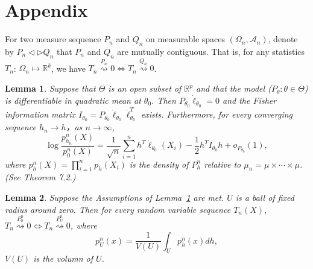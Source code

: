 \documentclass[review]{elsarticle}
\newtheorem{lemma}{Lemma}
\begin{document}
\section{Appendix}
For two measure sequence $P_n$ and $Q_n$ on measurable spaces $(\Omega_n,\mathcal{A}_n)$, denote by $P_n\triangleleft \triangleright Q_n$ that $P_n$ and $Q_n$ are mutually contiguous. That is, for any statistics $T_n$: $\Omega_n\mapsto \mathbb{R}^k$, we have $T_n\overset{P_n}{\rightsquigarrow}0\Leftrightarrow T_n\overset{Q_n}{\rightsquigarrow}0$.
\begin{lemma}\label{lemmaEx}
    Suppose that $\Theta$ is an open subset of $\mathbb{R}^p$ and that the model ($P_\theta: \theta \in\Theta$) is differentiable in quadratic mean at $\theta_0$. Then $P_{\theta_0}\dot{\ell}_{\theta_0}=0$ and the Fisher information matrix $I_{\theta_0}=P_{\theta_0}\dot{\ell}_{\theta_0}\dot{\ell}_{\theta_0}^T$ exists. Furthermore, for every converging sequence $h_n\to h$，as $n\to \infty$,
    \begin{equation}
        \log \frac{p^n_{h_n}(X)}{p^n_0(X)}=\frac{1}{\sqrt{n}}\sum^n_{i=1}h^T\dot{\ell}_{\theta_0}(X_i)-\frac{1}{2}h^TI_{\theta_0}h+o_{P_{\theta_0}}(1),
    \end{equation}
    where $p_h^n(X)=\prod_{i=1}^np_h(X_i)$ is the density of $P_h^n$ relative to $\mu_n=\mu\times \cdots \times \mu$.
    (See \cite{van2000asymptotic} Theorem 7.2.)
\end{lemma}



\begin{lemma}\label{lemmaContiguity}
    Suppose the Assumptions of Lemma~\ref{lemmaEx} are met. $U$ is a ball of fixed radius around zero. Then for every random variable sequence $T_n(X)$, $T_n\overset{P^n_0}{\rightsquigarrow}0\Leftrightarrow T_n\overset{P^n_U}{\rightsquigarrow}0$, where
\begin{equation}
    p^n_U(x)=\frac{1}{V(U)}\int_{U}p_h^n(x)dh,
\end{equation}
$V(U)$ is the volumn of $U$.
\end{lemma}
\end{document}
